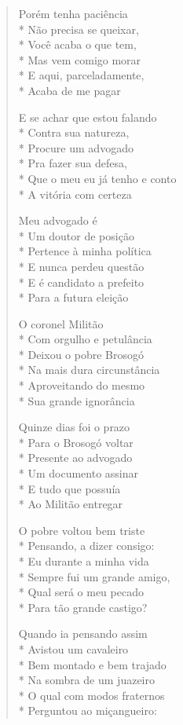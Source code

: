 \begin{verse}
Porém tenha paciência\\*
Não precisa se queixar,\\*
Você acaba o que tem,\\*
Mas vem comigo morar\\*
E aqui, parceladamente,\\*
Acaba de me pagar

E se achar que estou falando\\*
Contra sua natureza,\\*
Procure um advogado\\*
Pra fazer sua defesa,\\*
Que o meu eu já tenho e conto\\*
A vitória com certeza

Meu advogado é\\*
Um doutor de posição\\*
Pertence à minha política\\*
E nunca perdeu questão\\*
E é candidato a prefeito\\*
Para a futura eleição

O coronel Militão\\*
Com orgulho e petulância\\*
Deixou o pobre Brosogó\\*
Na mais dura circunstância\\*
Aproveitando do mesmo\\*
Sua grande ignorância

Quinze dias foi o prazo\\*
Para o Brosogó voltar\\*
Presente ao advogado\\*
Um documento assinar\\*
E tudo que possuía\\*
Ao Militão entregar

O pobre voltou bem triste\\*
Pensando, a dizer consigo:\\*
Eu durante a minha vida\\*
Sempre fui um grande amigo,\\*
Qual será o meu pecado\\*
Para tão grande castigo?

Quando ia pensando assim\\*
Avistou um cavaleiro\\*
Bem montado e bem trajado\\*
Na sombra de um juazeiro\\*
O qual com modos fraternos\\*
Perguntou ao miçangueiro:


\end{verse}

